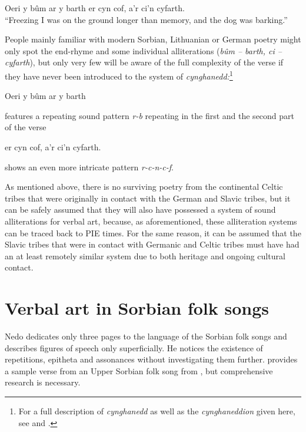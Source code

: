 \documentclass[output=paper,hidelinks]{langscibook}
\begin{document}
\ea
Oeri y bûm ar y barth er cyn cof, a’r ci’n cyfarth.\\
“Freezing I was on the ground longer than memory, and the dog was barking.”\z

 
People mainly familiar with modern Sorbian, Lithuanian or German poetry might only spot the end-rhyme and some individual alliterations (\textit{bûm – barth, ci – cyfarth}), but only very few will be aware of the full complexity of the verse if they have never been introduced to the system of \textit{cynghanedd:}\footnote{For a full description of \textit{cynghanedd} as well as the \textit{cynghaneddion} given here, see \citet{Morris-Jones1930} and \citet{Llwyd2007}.}
 


\ea Oeri y bûm ar y barth \z


 
features a repeating sound pattern \textit{r-b} repeating in the first and the second part of the verse
 


\ea er cyn cof, a’r ci’n cyfarth.\z


 
shows an even more intricate pattern \textit{r-c-n-c-f}.
\clearpage

 
As mentioned above, there is no surviving poetry from the continental Celtic tribes that were originally in contact with the German and Slavic tribes, but it can be safely assumed that they will also have possessed a system of sound alliterations for verbal art, because, as aforementioned, these alliteration systems can be traced back to PIE times. For the same reason, it can be assumed that the Slavic tribes that were in contact with Germanic and Celtic tribes must have had an at least remotely similar system due to both heritage and ongoing cultural contact.
 

\section{Verbal art in Sorbian folk songs}
 \largerpage
Nedo dedicates only three pages to the language of the Sorbian folk songs \citep[196--199]{Nedo1966} and describes figures of speech only superficially. He notices the existence of repetitions, epitheta and assonances without investigating them further.  provides a sample verse from an Upper Sorbian folk song from \citet[86]{HauptSmoler1843}, but comprehensive research is necessary.
 
\end{document}
